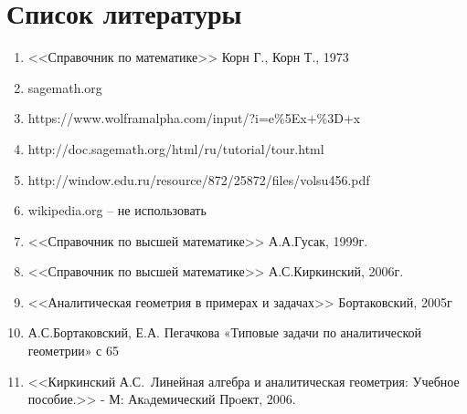 \section{Список литературы}
	\begin{enumerate}
		\item{<<Справочник по математике>> Корн Г., Корн Т., 1973}
		\item{sagemath.org}
		\item{https://www.wolframalpha.com/input/?i=e\%5Ex+\%3D+x }
		\item{http://doc.sagemath.org/html/ru/tutorial/tour.html}
		\item{http://window.edu.ru/resource/872/25872/files/volsu456.pdf}
		\item{wikipedia.org -- не использовать}
		\item{<<Справочник по высшей математике>> А.А.Гусак, 1999г.}
		\item{<<Справочник по высшей математике>> А.С.Киркинский, 2006г. }
		\item{<<Аналитическая геометрия в примерах и задачах>> Бортаковский, 2005г}
		\item{А.С.Бортаковский, Е.А. Пегачкова «Типовые задачи по аналитической геометрии» с 65}
		\item{<<Киркинский А.С. Линейная алгебра и аналитическая геометрия: Учебное пособие.>> - М: Акaдемический Прoект, 2006.}
	\end{enumerate}
	